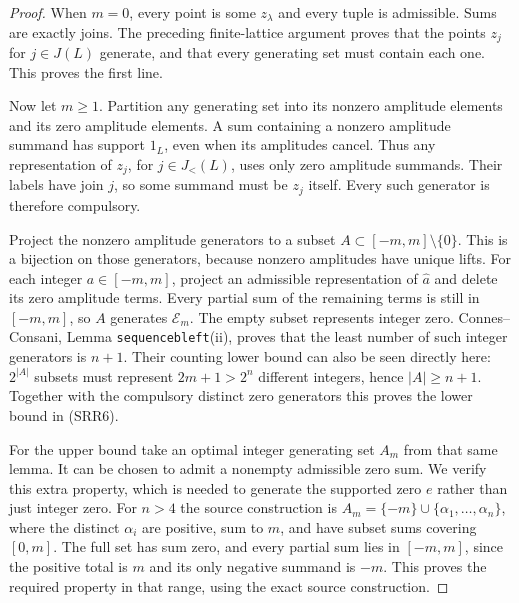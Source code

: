 \begin{proof}
When $m=0$, every point is some $z_\lambda$ and every tuple is
admissible. Sums are exactly joins. The preceding finite-lattice
argument proves that the points $z_j$ for $j\in J(L)$ generate,
and that every generating set must contain each one. This proves
the first line.

Now let $m\ge1$. Partition any generating set into its nonzero
amplitude elements and its zero amplitude elements. A sum containing
a nonzero amplitude summand has support $1_L$, even when its
amplitudes cancel. Thus any representation of $z_j$, for
$j\in J_{<}(L)$, uses only zero amplitude summands. Their labels
have join $j$, so some summand must be $z_j$ itself. Every such
generator is therefore compulsory.

Project the nonzero amplitude generators to a subset
$A\subset[-m,m]\setminus\{0\}$. This is a bijection on those
generators, because nonzero amplitudes have unique lifts. For each
integer $a\in[-m,m]$, project an admissible representation of
$\widehat a$ and delete its zero amplitude terms. Every partial
sum of the remaining terms is still in $[-m,m]$, so $A$ generates
$\mathcal E_m$. The empty subset represents integer zero.
Connes--Consani, Lemma \texttt{sequencebleft}(ii), proves that the
least number of such integer generators is $n+1$. Their counting
lower bound can also be seen directly here: $2^{|A|}$ subsets must
represent $2m+1>2^n$ different integers, hence $|A|\ge n+1$.
Together with the compulsory distinct zero generators this proves
the lower bound in (SRR6).

For the upper bound take an optimal integer generating set $A_m$
from that same lemma. It can be chosen to admit a nonempty
admissible zero sum. We verify this extra property, which is needed
to generate the supported zero $e$ rather than just integer zero.
For $n>4$ the source construction is
$A_m=\{-m\}\cup\{\alpha_1,\ldots,\alpha_n\}$, where
the distinct $\alpha_i$ are positive, sum to $m$, and have subset
sums covering $[0,m]$. The full set has sum zero, and every partial
sum lies in $[-m,m]$, since the positive total is $m$ and its only
negative summand is $-m$. This proves the required property in
that range, using the exact source construction.


\end{proof}
